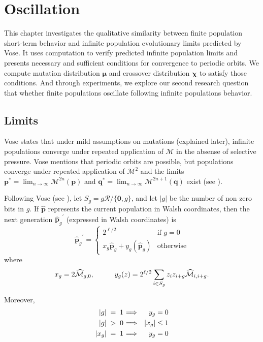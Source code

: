 \chapter{Oscillation} \label{ch:oscillation}
This chapter investigates the qualitative similarity between finite population 
short-term behavior and infinite population evolutionary limits predicted by Vose. 
It uses computation to verify predicted infinite population limits and presents 
necessary and sufficient conditions for convergence to periodic orbits. 
We compute mutation distribution $\bm{\mu}$ and crossover distribution $\bm{\chi}$ 
to satisfy those conditions. And through experiments, we explore our second research 
question that whether finite populations oscillate following infinite populations behavior.

\section{Limits}
\label{Limits}
Vose states that under mild assumptions on mutations (explained later), infinite populations converge under repeated application 
of $\mathcal{M}$ in the absense of selective pressure. Vose mentions that periodic orbits are possible, but populations converge under 
repeated application of $\mathcal{M}^2$ and the limits $\bm{p}^\ast = \lim_{n \rightarrow \infty} \mathcal{M}^{2n}({\bm p})$ 
and ${\bm q}^\ast = \lim_{n \rightarrow \infty} \mathcal{M}^{2n+1}({\bm q})$ exist (see \cite{Vose1999}).

Following Vose (see \cite{Vose1999}), let $S_g = g \mathcal{R} / \{\textbf{0}, g\}$, and let $|g|$ be the number of non zero bits in $g$. 
If $\widehat{\bm{p}}$ represents the current population in Walsh coordinates, then the next generation ${\widehat{\bm{p}}_g}^{\prime}$ 
(expressed in Walsh coordinates) is 
\[
{{\widehat{\bm{p}}}_g}^{\prime}  = \begin{cases}
    2^{\ell /2}  & \text{if $g = 0$}\\
    x_g \widehat{{\bm p}}_g + y_g(\widehat{{\bm p}}_g) & \text{otherwise}
  \end{cases}
\]
where
\[
x_g = 2\widehat{\mathcal{M}}_{g,0},  \hspace*{1cm} y_g(z) = 2^{\ell /2} \sum_{i \in S_g} z_i z_{i+g} \widehat{\mathcal{M}}_{i,i+g}.
\]

Moreover, 
\begin{eqnarray*}
|g| \;=\; 1 \hspace{0.01in} & \Longrightarrow & y_g = 0 \\
|g| \;>\; 0 \hspace{0.01in} & \Longrightarrow & |x_g| \leq 1 \\
|x_g| \;=\; 1 \hspace{0.01in} & \Longrightarrow & y_g = 0
\end{eqnarray*}

